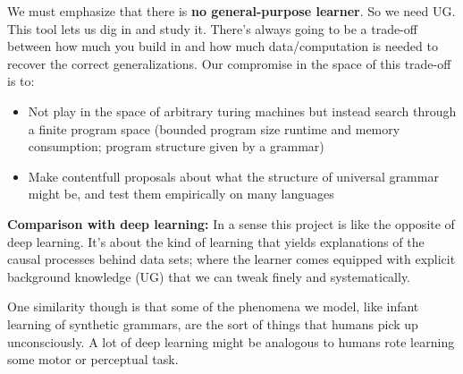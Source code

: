 \documentclass{article}
\begin{document}
We must emphasize that there is \textbf{no general-purpose
  learner}. So we need UG. This tool lets us dig in and study it.
There's always going to be a trade-off between how much you build in and how much data/computation is needed to recover the correct generalizations. Our compromise in the space of this trade-off is to:
\begin{itemize}
\item  Not play in the space of arbitrary turing machines but instead search through a finite program space (bounded program size runtime and memory consumption; program structure given by a grammar)
  \item Make contentfull proposals about what the structure of
    universal grammar might be, and test them empirically on many
    languages
\end{itemize}

\textbf{Comparison with deep learning:} In a sense this project is like
the opposite of deep learning. It's about the kind of learning that
yields explanations of the causal processes behind data sets; where
the learner comes equipped with explicit background knowledge (UG)
that we can tweak finely and systematically.

One similarity though is that some of the phenomena we model, like
infant learning of synthetic grammars, are the sort of things that
humans pick up unconsciously. A lot of deep learning might be
analogous to humans rote learning some motor or perceptual task.
\end{document}
